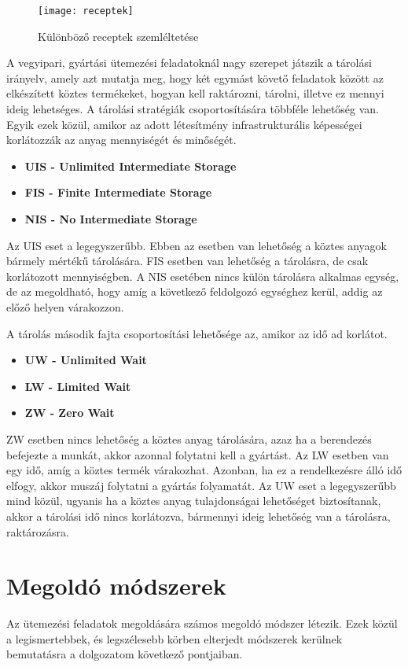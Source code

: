 \begin{figure}[H]	
\begin{center}
\texttt{[image: receptek]}
\caption{Különböző receptek szemléltetése}
\label{receptek}
\end{center}
\end{figure}
\newpage
A vegyipari, gyártási ütemezési feladatoknál nagy szerepet játszik a tárolási irányelv, amely azt mutatja meg, hogy két egymást követő feladatok között az elkészített köztes termékeket, hogyan kell raktározni, tárolni, illetve ez mennyi ideig lehetséges. A tárolási stratégiák csoportosítására többféle lehetőség van. Egyik ezek közül, amikor az adott létesítmény infrastrukturális képességei korlátozzák az anyag mennyiségét és minőségét.
\begin{itemize}
	\item \textbf{UIS - Unlimited Intermediate Storage}
	\item \textbf{FIS - Finite Intermediate Storage}
	\item \textbf{NIS - No Intermediate Storage}
\end{itemize}
Az UIS eset a legegyszerűbb. Ebben az esetben van lehetőség a köztes anyagok bármely mértékű tárolására. FIS esetben van lehetőség a tárolásra, de csak korlátozott mennyiségben. A NIS esetében nincs külön tárolásra alkalmas egység, de az megoldható, hogy amíg a következő feldolgozó egységhez kerül, addig az előző helyen várakozzon.

A tárolás második fajta csoportosítási lehetősége az, amikor az idő ad korlátot.
\begin{itemize}
	\item \textbf{UW - Unlimited Wait}
	\item \textbf{LW - Limited Wait}
	\item \textbf{ZW - Zero Wait}	
\end{itemize}
ZW esetben nincs lehetőség a köztes anyag tárolására, azaz ha a berendezés befejezte a munkát, akkor azonnal folytatni kell a gyártást. Az LW esetben van egy idő, amíg a köztes termék várakozhat. Azonban, ha ez a rendelkezésre álló idő elfogy, akkor muszáj folytatni a gyártás folyamatát. Az UW eset a legegyszerűbb mind közül, ugyanis ha a köztes anyag tulajdonságai lehetőséget biztosítanak, akkor a tárolási idő nincs korlátozva, bármennyi ideig lehetőség van a tárolásra, raktározásra.
\newpage
\section{Megoldó módszerek}
Az ütemezési feladatok megoldására számos megoldó módszer létezik. Ezek közül a legismertebbek, és legszélesebb körben elterjedt módszerek kerülnek bemutatásra a dolgozatom következő pontjaiban.
